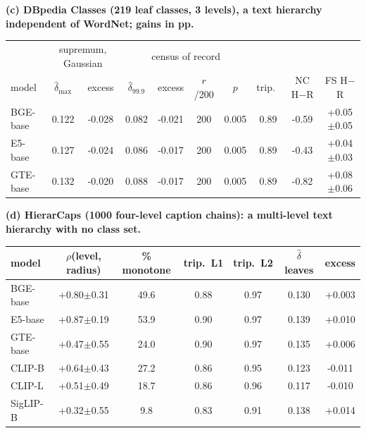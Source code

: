 \begin{table}[H]
{}
\label{tab:q7-wordnet}
\end{table}
\begin{table}[H]\ContinuedFloat
\centering
\scriptsize
\setlength{\tabcolsep}{2.6pt}
\begingroup
\noindent\textbf{(c) DBpedia Classes (219 leaf classes, 3 levels), a text hierarchy independent of WordNet; gains in pp.}\par\vspace{1.5pt}
\setlength{\tabcolsep}{2.5pt}
\begin{tabular}{lcc|cccc|ccc}
\toprule
 & \multicolumn{2}{c|}{supremum, Gaussian} & \multicolumn{4}{c|}{census of record} & & & \\
model & $\hat\delta_{\max}$ & excess & $\hat\delta_{99.9}$ & excess & $r$/200 & $p$ & trip.\ & NC H$-$R & FS H$-$R \\
\midrule
BGE-base & 0.122 & -0.028 & 0.082 & -0.021 & 200 & 0.005 & 0.89 & -0.59 & +0.05$\pm$0.05 \\
E5-base & 0.127 & -0.024 & 0.086 & -0.017 & 200 & 0.005 & 0.89 & -0.43 & +0.04$\pm$0.03 \\
GTE-base & 0.132 & -0.020 & 0.088 & -0.017 & 200 & 0.005 & 0.89 & -0.82 & +0.08$\pm$0.06 \\
\bottomrule
\end{tabular}
\par\vspace{5pt}
\endgroup
\begingroup
\noindent\textbf{(d) HierarCaps (1000 four-level caption chains): a multi-level text hierarchy with no class set.}\par\vspace{1.5pt}
\footnotesize
\setlength{\tabcolsep}{4pt}
\begin{tabular}{lcccccc}
\toprule
model & $\rho$(level, radius) & \% monotone & trip.\ L1 & trip.\ L2 & $\hat\delta$ leaves & excess \\
\midrule
BGE-base & +0.80$\pm$0.31 & 49.6 & 0.88 & 0.97 & 0.130 & +0.003 \\
E5-base & +0.87$\pm$0.19 & 53.9 & 0.90 & 0.97 & 0.139 & +0.010 \\
GTE-base & +0.47$\pm$0.55 & 24.0 & 0.90 & 0.97 & 0.135 & +0.006 \\
CLIP-B & +0.64$\pm$0.43 & 27.2 & 0.86 & 0.95 & 0.123 & -0.011 \\
CLIP-L & +0.51$\pm$0.49 & 18.7 & 0.86 & 0.96 & 0.117 & -0.010 \\
SigLIP-B & +0.32$\pm$0.55 & 9.8 & 0.83 & 0.91 & 0.138 & +0.014 \\
\bottomrule
\end{tabular}

\end{table}
